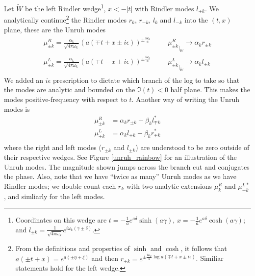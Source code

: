 \documentclass[12pt,a4paper]{article}
\begin{document}
Let $\widetilde{W}$ be the left Rindler wedge\footnote{Coordinates on this wedge are $t = -\frac{1}{a}e^{a\delta} \sinh(a\gamma)$, $x = -\frac{1}{a}e^{a\delta} \cosh(a\gamma)$; and $l_{\pm k} = \frac{1}{\sqrt{4 \pi \omega_k}} e^{i\omega_k(\gamma \pm \delta)}$.}, $x < -|t|$ with Rindler modes $l_{\pm k}$.  We analytically continue\footnote{From the definitions and properties of $\sinh$ and $\cosh$, it follows that $a(\pm t + x) = e^{a(\pm \eta + \xi)}$ and then $r_{\pm k} = e^{\pm \frac{i \omega_k}{a}\log a(\mp t + x \pm i\epsilon)}$.  Similiar statements hold for the left wedge.} the Rindler modes $r_k$, $r_{-k}$, $l_k$ and $l_{-k}$ into the $(t,x)$ plane, these are the Unruh modes
\begin{equation}
  \begin{array}{ll}
    \mu^R_{\pm k} = \frac{\alpha_k }{\sqrt{4 \pi \omega_k}} (a(\mp t + x \pm  i \epsilon))^{\pm \frac{i \omega_k}{a}} & \hspace{20pt}
       {\mu^R_{\pm k}}_{|_W} \rightarrow \alpha_k r_{\pm k} \\
    \mu^L_{\pm k} =  \frac{\alpha_k}{\sqrt{4 \pi \omega_k}} (a(\mp t - x \pm  i \epsilon))^{\pm \frac{i \omega_k}{a}} & \hspace{20pt}
    {\mu^L_{\pm k}}_{|_{\widetilde{W}}} \rightarrow \alpha_k l_{\pm k} \\
  \end{array}
\end{equation}
We added an $i \epsilon$ prescription to dictate which branch of the log to take so that the modes are analytic and bounded on the $\mathfrak{I}(t) < 0$ half plane.  This makes the modes positive-frequency with respect to $t$.  Another way of writing the Unruh modes is
\begin{equation}
\begin{aligned}
  \mu^R_{\pm k} &= \alpha_k r_{\pm k} + \beta_k l^*_{\mp k} \\
  \mu^L_{\pm k} &= \alpha_k l_{\pm k} + \beta_k r^*_{\mp k} \\
\end{aligned}
\label{unruh_mode_def}
\end{equation}
where the right and left modes ($r_{\pm k}$ and $l_{\pm k}$) are understood to be zero outside of their respective wedges. See Figure \ref{unruh_rainbow} for an illustration of the Unruh modes. The magnitude shown jumps across the branch cut and conjugates the phase.  Also, note that we have ``twice as many'' Unruh modes as we have Rindler modes; we double count each $r_k$ with two analytic extensions $\mu^R_k$ and $\mu^{L*}_{-k}$, and simliarly for the left modes.
\end{document}
